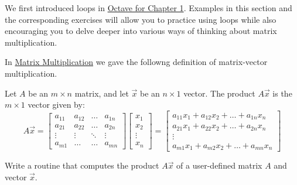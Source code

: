 \documentclass{ximera}
\begin{document}
    We first introduced loops in \href{https://ximera.osu.edu/linearalgebradzv3/xOctave/OCT_vectors/main}{Octave for Chapter 1}.  Examples in this section and the corresponding exercises will allow you to practice using loops while also encouraging you to delve deeper into various ways of thinking about matrix multiplication. 

    \begin{example}\label{ex:oct_mat_prod_def}
        In \href{https://ximera.osu.edu/linearalgebradzv3/LinearAlgebraInteractiveIntro/MAT-0020/main}{Matrix Multiplication} we gave the followng definition of matrix-vector multiplication.  
        
            Let $A$ be an $m\times n$ matrix, and let $\vec{x}$ be an $n\times 1$ vector.  The product $A\vec{x}$ is the $m\times 1$ vector given by:
            $$A\vec{x}=\begin{bmatrix}
                       a_{11} & a_{12}&\dots&a_{1n}\\
                       a_{21}&a_{22} &\dots &a_{2n}\\
                    \vdots & \vdots&\ddots &\vdots\\
                    a_{m1}&\dots &\dots &a_{mn}
                     \end{bmatrix}\begin{bmatrix}x_1\\x_2\\\vdots\\x_n\end{bmatrix}=
                     \begin{bmatrix}a_{11}x_1+a_{12}x_2+\ldots +a_{1n}x_n\\a_{21}x_1+a_{22}x_2+\ldots +a_{2n}x_n\\\vdots\\a_{m1}x_1+a_{m2}x_2+\ldots +a_{mn}x_n\end{bmatrix}$$
        
        Write a routine that computes the product $A\vec{x}$ of a user-defined matrix $A$ and vector $\vec{x}$.


\end{example}
\end{document}
